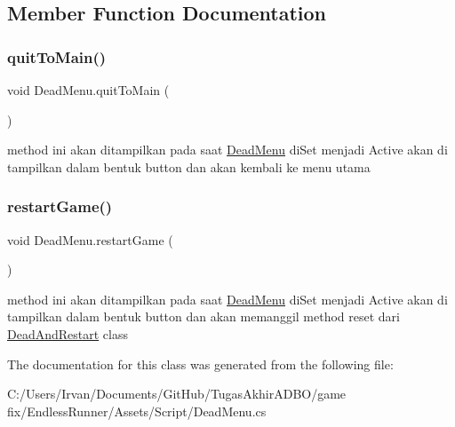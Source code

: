 \subsection{Member Function Documentation}
\hypertarget{class_dead_menu_ab1eb66c9f9af09ca199d9878509fd5ba}{}\label{class_dead_menu_ab1eb66c9f9af09ca199d9878509fd5ba} 
\subsubsection{\texorpdfstring{quit\+To\+Main()}{quitToMain()}}
{\footnotesize\ttfamily void Dead\+Menu.\+quit\+To\+Main (\begin{DoxyParamCaption}{ }\end{DoxyParamCaption})}



method ini akan ditampilkan pada saat \hyperlink{class_dead_menu}{Dead\+Menu} di\+Set menjadi Active akan di tampilkan dalam bentuk button dan akan kembali ke menu utama 

\hypertarget{class_dead_menu_a26ba3bf8f5b33b3f7116f66cbc027757}{}\label{class_dead_menu_a26ba3bf8f5b33b3f7116f66cbc027757} 
\subsubsection{\texorpdfstring{restart\+Game()}{restartGame()}}
{\footnotesize\ttfamily void Dead\+Menu.\+restart\+Game (\begin{DoxyParamCaption}{ }\end{DoxyParamCaption})}



method ini akan ditampilkan pada saat \hyperlink{class_dead_menu}{Dead\+Menu} di\+Set menjadi Active akan di tampilkan dalam bentuk button dan akan memanggil method reset dari \hyperlink{class_dead_and_restart}{Dead\+And\+Restart} class 



The documentation for this class was generated from the following file\+:\begin{DoxyCompactItemize}
\item 
C\+:/\+Users/\+Irvan/\+Documents/\+Git\+Hub/\+Tugas\+Akhir\+A\+D\+B\+O/game fix/\+Endless\+Runner/\+Assets/\+Script/Dead\+Menu.\+cs\end{DoxyCompactItemize}
